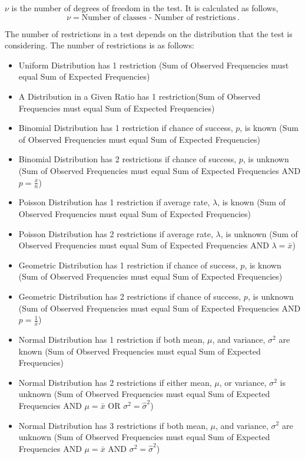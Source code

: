 \begin{note}
	$\nu$ is the number of degrees of freedom in the test. It is calculated as follows,
	\begin{equation}
		\nu = \text{Number of classes - Number of restrictions} \,.
	\end{equation}

The number of restrictions in a test depends on the distribution that the test is considering. The number of restrictions is as follows:
\begin{itemize}
	\item Uniform Distribution has 1 restriction (Sum of Observed Frequencies must equal Sum of Expected Frequencies)
	\item A Distribution in a Given Ratio has 1 restriction(Sum of Observed Frequencies must equal Sum of Expected Frequencies)
	\item Binomial Distribution has 1 restriction if chance of success, $p$, is known (Sum of Observed Frequencies must equal Sum of Expected Frequencies)
	\item Binomial Distribution has 2 restrictions if chance of success, $p$, is unknown (Sum of Observed Frequencies must equal Sum of Expected Frequencies AND $p=\frac{\bar{x}}{n}$)
	\item Poisson Distribution has 1 restriction if average rate, $\lambda$, is known (Sum of Observed Frequencies must equal Sum of Expected Frequencies)
	\item Poisson Distribution has 2 restrictions if average rate, $\lambda$, is unknown (Sum of Observed Frequencies must equal Sum of Expected Frequencies AND $\lambda=\bar{x}$)
	\item Geometric Distribution has 1 restriction if chance of success, $p$, is known (Sum of Observed Frequencies must equal Sum of Expected Frequencies)
	\item Geometric Distribution has 2 restrictions if chance of success, $p$, is unknown (Sum of Observed Frequencies must equal Sum of Expected Frequencies AND $p=\frac{1}{\bar{x}}$)
	\item Normal Distribution has 1 restriction if both mean, $\mu$, and variance, $\sigma^2$ are known (Sum of Observed Frequencies must equal Sum of Expected Frequencies)
	\item Normal Distribution has 2 restrictions if either mean, $\mu$, or variance, $\sigma^2$ is unknown (Sum of Observed Frequencies must equal Sum of Expected Frequencies AND $\mu=\bar{x}$ OR $\sigma^2=\hat{\sigma}^2$)
	\item Normal Distribution has 3 restrictions if both mean, $\mu$, and variance, $\sigma^2$ are unknown (Sum of Observed Frequencies must equal Sum of Expected Frequencies AND $\mu=\bar{x}$ AND $\sigma^2=\hat{\sigma}^2$)
\end{itemize} 

\end{note}






